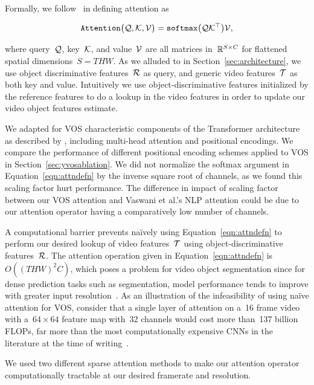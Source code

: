 Formally, we follow~\citet{vaswani2017attention} in defining attention as

\begin{equation}
\mathtt{Attention}\big(\mathcal{Q}{}, \mathcal{K}{}, \mathcal{V}{}\big) = \mathtt{softmax}{}\big(\mathcal{Q}{}\mathcal{K}{}^\top\big)\mathcal{V}{},
\label{eqn:attndefn}
\end{equation}

\noindent where query~$\mathcal{Q}{}$, key~$\mathcal{K}{}$, and value~$\mathcal{V}{}$
are all matrices in~$\mathbb{R}{}^{S\times C}$ for flattened spatial dimensions~$S =
THW$.
As we alluded to in Section~\ref{sec:architecture}, we use object
discriminative features~$\mathcal{R}{}$ as query, and generic video
features~$\mathcal{T}{}$ as both key and value.
Intuitively we use object-discriminative features initialized by the reference
features to do a lookup in the video features in order to update our video
object features estimate.

We adapted for VOS characteristic components of the Transformer architecture as
described by \citet{vaswani2017attention}, including multi-head
attention and positional encodings.
We compare the performance of different positional encoding schemes applied to
VOS in Section~\ref{sec:yvosablation}.
We did not normalize the softmax argument in Equation~\ref{eqn:attndefn} by the
inverse square root of channels, as we found this scaling factor hurt
performance.
The difference in impact of scaling factor between our VOS attention and
Vaswani et al.'s NLP attention could be due to our attention operator having a
comparatively low number of channels.

A computational barrier prevents na\"ively using Equation~\ref{eqn:attndefn} to
perform our desired lookup of video features~$\mathcal{T}{}$ using
object-discriminative features~$\mathcal{R}{}$.
The attention operation given in Equation~\ref{eqn:attndefn} is~$O({(THW)}^2
C)$, which poses a problem for video object segmentation since for dense
prediction tasks such as segmentation, model performance tends to improve with
greater input resolution~\citep{zhao2017icnet}.
As an illustration of the infeasibility of using na\"ive attention for VOS,
consider that a single layer of attention on a~\num{16} frame video with
a~$64\times 64$ feature map with~\num{32} channels would cost more
than~\num{137} billion FLOPs, far more than the most computationally expensive
CNNs in the literature at the time of writing~\citep{tan2019efficientnet}.

We used two different sparse attention methods to make our attention operator
computationally tractable at our desired framerate and resolution.


